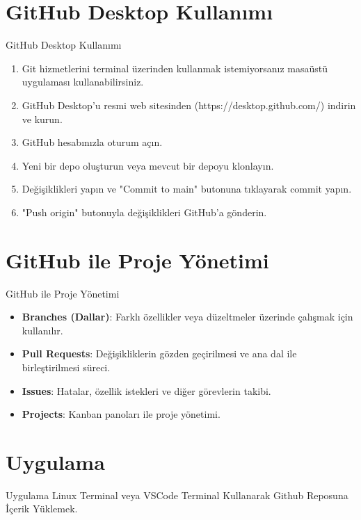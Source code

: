 \documentclass{beamer}
\begin{document}
\section{GitHub Desktop Kullanımı}
\begin{frame}{GitHub Desktop Kullanımı}
    \begin{enumerate}
        \item Git hizmetlerini terminal üzerinden kullanmak istemiyorsanız masaüstü uygulaması kullanabilirsiniz.
        \item GitHub Desktop'u resmi web sitesinden (https://desktop.github.com/) indirin ve kurun.
        \item GitHub hesabınızla oturum açın.
        \item Yeni bir depo oluşturun veya mevcut bir depoyu klonlayın.
        \item Değişiklikleri yapın ve "Commit to main" butonuna tıklayarak commit yapın.
        \item "Push origin" butonuyla değişiklikleri GitHub'a gönderin.
    \end{enumerate}
\end{frame}

\section{GitHub ile Proje Yönetimi}
\begin{frame}{GitHub ile Proje Yönetimi}
    \begin{itemize}
        \item \textbf{Branches (Dallar)}: Farklı özellikler veya düzeltmeler üzerinde çalışmak için kullanılır.
        \item \textbf{Pull Requests}: Değişikliklerin gözden geçirilmesi ve ana dal ile birleştirilmesi süreci.
        \item \textbf{Issues}: Hatalar, özellik istekleri ve diğer görevlerin takibi.
        \item \textbf{Projects}: Kanban panoları ile proje yönetimi.
    \end{itemize}
\end{frame}

\section{Uygulama}
\begin{frame}{Uygulama}
    \centering
    \Huge Linux Terminal veya VSCode Terminal Kullanarak Github Reposuna İçerik Yüklemek.

\end{frame}
\end{document}
